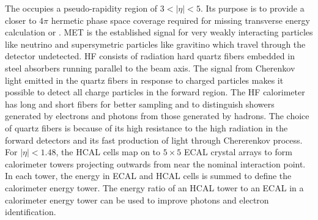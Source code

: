 \newline
The  occupies a pseudo-rapidity region of $3 < \vert \eta \vert < 5$.
Its purpose is to provide a closer to $4\pi$ hermetic phase space coverage required for missing transverse energy calculation or . MET is the established signal for very weakly interacting particles like neutrino and supersymetric particles like gravitino which travel through the detector undetected. %
HF consists of radiation hard quartz fibers embedded in steel absorbers running parallel to the beam axis. The signal from Cherenkov light emitted in the quartz fibers in response to charged particles makes it possible to detect all charge particles in the forward region. The HF calorimeter has long and short fibers for better sampling and to distinguish showers generated by electrons and photons from those generated by hadrons.
 The choice of quartz fibers is because of its high resistance to the high radiation in the forward detectors and its fast production of light through Chererenkov process. 
\newline
For $\vert \eta \vert < 1.48$, the HCAL cells map on to $5 \times 5$ ECAL crystal arrays to form calorimeter towers projecting  outwards from near the nominal interaction point. 
In each tower, the energy in ECAL and HCAL cells is summed to define the calorimeter energy tower. The energy ratio of an 
HCAL tower to an ECAL in a calorimeter energy tower can be used to improve photons and electron identification. 
